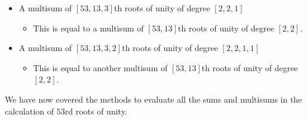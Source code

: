 \documentclass{article}
\begin{document}
        \begin{itemize}
            \item A multisum of $ [53, 13, 3] $th roots of unity of degree $ [2, 2, 1] $
            \begin{itemize}
                \item This is equal to a multisum of $ [53, 13] $th roots of unity of degree $ [2, 2] $.
            \end{itemize}
            \item A multisum of $ [53, 13, 3, 2] $th roots of unity of degree $ [2, 2, 1, 1] $
            \begin{itemize}
                \item This is equal to another multisum of $ [53, 13] $th roots of unity of degree $ [2, 2] $.
            \end{itemize}
        \end{itemize}
        We have now covered the methods to evaluate all the sums and multisums in the calculation of $ 53 $rd roots of unity.\\
\end{document}
